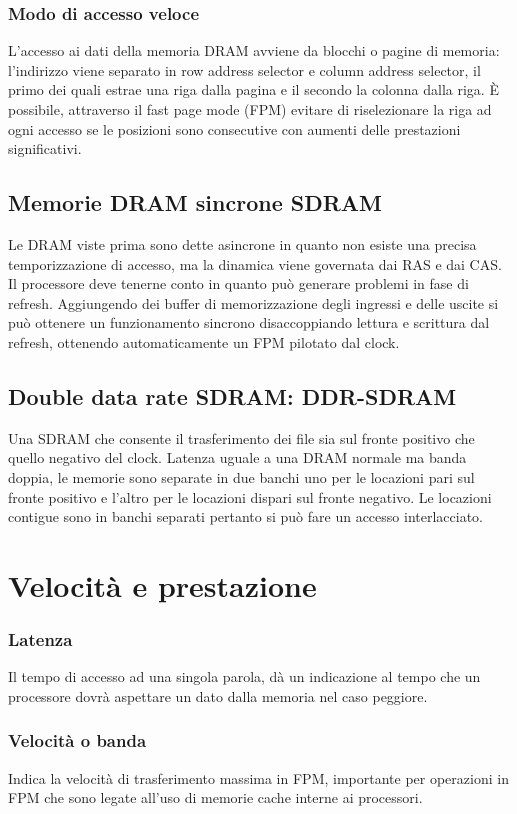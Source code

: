 \subsubsection{Modo di accesso veloce}
L'accesso ai dati della memoria DRAM avviene da blocchi o pagine di memoria: l'indirizzo viene separato in row address selector e column address selector, il primo dei 
quali estrae una riga dalla pagina e il secondo la colonna dalla riga. \`E possibile, attraverso il fast page mode (FPM) evitare di riselezionare la riga ad ogni accesso
se le posizioni sono consecutive con aumenti delle prestazioni significativi. 
\subsection{Memorie DRAM sincrone SDRAM}
Le DRAM viste prima sono dette asincrone in quanto non esiste una precisa temporizzazione di accesso, ma la dinamica viene governata dai RAS e dai CAS. Il processore
deve tenerne conto in quanto pu\`o generare problemi in fase di refresh. Aggiungendo dei buffer di memorizzazione degli ingressi e delle uscite si pu\`o ottenere 
un funzionamento sincrono disaccoppiando lettura e scrittura dal refresh, ottenendo automaticamente un FPM pilotato dal clock. 
\subsection{Double data rate SDRAM: DDR-SDRAM}
Una SDRAM che consente il trasferimento dei file sia sul fronte positivo che quello negativo del clock. Latenza uguale a una DRAM normale ma banda doppia, le memorie
sono separate in due banchi uno per le locazioni pari sul fronte positivo e l'altro per le locazioni dispari sul fronte negativo. Le locazioni contigue sono in banchi
separati pertanto si pu\`o fare un accesso interlacciato. 
\section{Velocit\`a e prestazione}
\subsubsection{Latenza}
Il tempo di accesso ad una singola parola, d\`a un indicazione al tempo che un processore dovr\`a aspettare un dato dalla memoria nel caso peggiore.
\subsubsection{Velocit\`a o banda}
Indica la velocit\`a di trasferimento massima in FPM, importante per operazioni in FPM che sono legate all'uso di memorie cache interne ai processori. 
